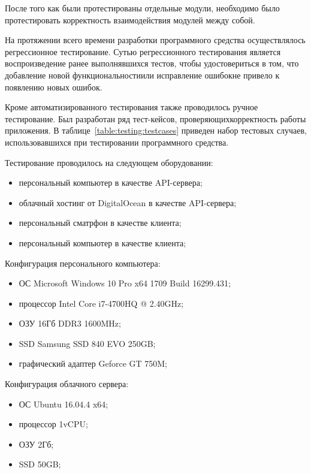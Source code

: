 После того как были протестированы отдельные модули, необходимо было  протестировать  корректность  взаимодействия  модулей  между  собой. 

На протяжении всего времени разработки программного средства осуществлялось регрессионное тестирование. Сутью регрессионного тестирования является воспроизведение ранее выполнявшихся тестов, чтобы удостовериться  в  том,  что  добавление  новой  функциональностиили  исправление ошибокне привело к появлению новых ошибок.

Кроме  автоматизированного  тестирования  также  проводилось  ручное тестирование. Был  разработан  ряд  тест-кейсов, проверяющихкорректность работы приложения. В таблице~\ref{table:testing:testcases}  приведен набор тестовых случаев, использовавшихся при тестировании программного средства.

Тестирование проводилось на следующем оборудовании:

\begin{itemize}
	\item персональный компьютер в качестве API-сервера;
	\item облачный хостинг от DigitalOcean в качестве API-сервера;
	\item персональный сматрфон в качестве клиента;
	\item персональный компьютер в качестве клиента;
\end{itemize}

Конфигурация персонального компьютера:

\begin{itemize}
	\item ОС Microsoft Windows 10 Pro x64 1709 Build 16299.431;
	\item процессор Intel Core i7-4700HQ @ 2.40GHz;
	\item ОЗУ 16Гб DDR3 1600MHz;
	\item SSD Samsung SSD 840 EVO 250GB;
	\item графический адаптер Geforce GT 750M;
\end{itemize}

Конфигурация облачного сервера:

\begin{itemize}
	\item ОС Ubuntu 16.04.4 x64;
	\item процессор 1vCPU;
	\item ОЗУ 2Гб;
	\item SSD 50GB;
\end{itemize}

